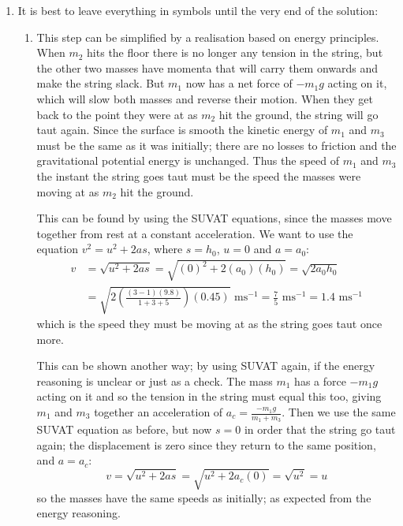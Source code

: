 \begin{problem}[A1969AMIIQ2a]
{\begin{enumerate}
	\begin{align*} F &= (m_{2} - m_{1})g\\ &= (m_{1} + m_{2} + m_{3})a \end{align*} so \begin{align*} a = \frac{(m_{2} - m_{1})g}{m_{1} + m_{2} + m_{3}} = a_{0} \end{align*}
is the initial acceleration.
	\item It is best to leave everything in symbols until the very end of the solution:
	\begin{enumerate}
		\item This step can be simplified by a realisation based on energy principles. When $m_{2}$ hits the floor there is no longer any tension in the string, but the other two masses have momenta that will carry them onwards and make the string slack. But $m_{1}$ now has a net force of $-m_{1}g$ acting on it, which will slow both masses and reverse their motion. When they get back to the point they were at as $m_{2}$ hit the ground, the string will go taut again. Since the surface is smooth the kinetic energy of $m_{1}$ and $m_{3}$ must be the same as it was initially; there are no losses to friction and the gravitational potential energy is unchanged. Thus the speed of $m_{1}$ and $m_{3}$ the instant the string goes taut must be the speed the masses were moving at as $m_{2}$ hit the ground.

This can be found by using the SUVAT equations, since the masses move together from rest at a constant acceleration. We want to use the equation $v^{2} = u^{2} + 2as$, where $s = h_{0}$, $u = 0$ and $a = a_{0}$:
\begin{align*} 
v &= \sqrt{u^{2} + 2as} = \sqrt{(0)^{2} + 2(a_{0})(h_{0})} = \sqrt{2a_{0}h_{0}} \\
 &= \sqrt{2\left(\frac{(3 - 1)(9.8)}{1 + 3 + 5}\right)(0.45)} \text{ ms}^{-1} = \frac{7}{5} \text{ ms}^{-1} = 1.4 \text{ ms}^{-1}  
 \end{align*}
which is the speed they must be moving at as the string goes taut once more. 

This can be shown another way; by using SUVAT again, if the energy reasoning is unclear or just as a check. The mass $m_{1}$ has a force $-m_{1}g$ acting on it and so the tension in the string must equal this too, giving $m_{1}$ and $m_{3}$ together an acceleration of $a_{c} = \frac{-m_{1}g}{m_{1} + m_{3}}$. Then we use the same SUVAT equation as before, but now $s = 0$ in order that the string go taut again; the displacement is zero since they return to the same position, and $a = a_{c}$:
\begin{equation*} 
v = \sqrt{u^{2} + 2as} = \sqrt{u^{2} + 2a_{c}(0)} = \sqrt{u^{2}} = u 
\end{equation*}
so the masses have the same speeds as initially; as expected from the energy reasoning.


\end{enumerate}
\end{enumerate}}
\end{problem}
